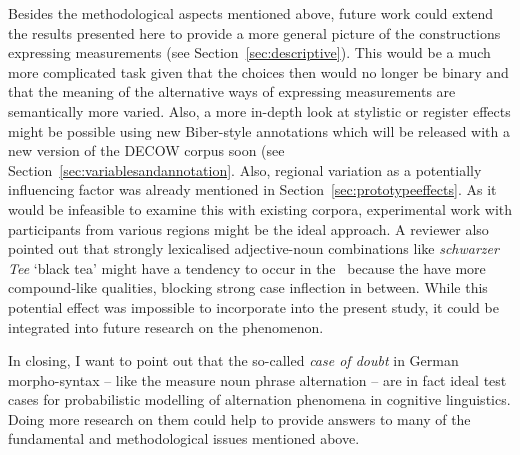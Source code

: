 Besides the methodological aspects mentioned above, future work could extend the results presented here to provide a more general picture of the constructions expressing measurements (see Section~\ref{sec:descriptive}).
This would be a much more complicated task given that the choices then would no longer be binary and that the meaning of the alternative ways of expressing measurements are semantically more varied.
Also, a more in-depth look at stylistic or register effects might be possible using new Biber-style annotations which will be released with a new version of the DECOW corpus soon (see Section~\ref{sec:variablesandannotation}.
Also, regional variation as a potentially influencing factor was already mentioned in Section~\ref{sec:prototypeeffects}.
As it would be infeasible to examine this with existing corpora, experimental work with participants from various regions might be the ideal approach.
A reviewer also pointed out that strongly lexicalised adjective-noun combinations like \textit{schwarzer Tee} `black tea' might have a tendency to occur in the \NACa\ because the have more compound-like qualities, blocking strong case inflection in between.
While this potential effect was impossible to incorporate into the present study, it could be integrated into future research on the phenomenon.

In closing, I want to point out that the so-called \textit{case of doubt} in German morpho-syntax -- like the measure noun phrase alternation -- are in fact ideal test cases for probabilistic modelling of alternation phenomena in cognitive linguistics.
Doing more research on them could help to provide answers to many of the fundamental and methodological issues mentioned above.
